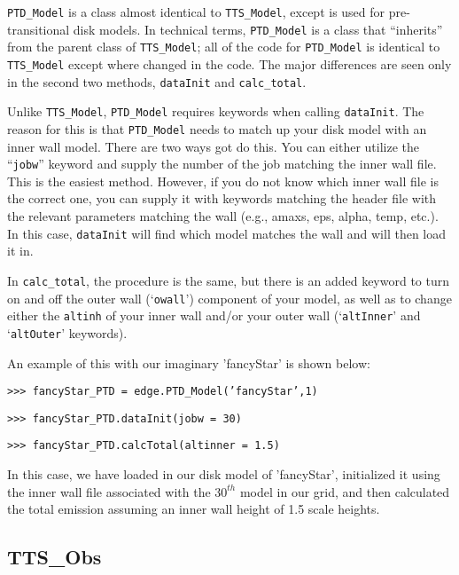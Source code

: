 \documentclass{article}
\begin{document}
\texttt{PTD\_Model} is a class almost identical to \texttt{TTS\_Model}, except is used for pre-transitional disk models. In technical terms, \texttt{PTD\_Model} is a class that “inherits” from the parent class of \texttt{TTS\_Model}; all of the code for \texttt{PTD\_Model} is identical to \texttt{TTS\_Model} except where changed in the code. The major differences are seen only in the second two methods, \texttt{dataInit} and \texttt{calc\_total}.
 
Unlike \texttt{TTS\_Model}, \texttt{PTD\_Model} requires keywords when calling \texttt{dataInit}. The reason for this is that \texttt{PTD\_Model} needs to match up your disk model with an inner wall model. There are two ways got do this. You can either utilize the “\texttt{jobw}” keyword and supply the number of the job matching the inner wall file. This is the easiest method. However, if you do not know which inner wall file is the correct one, you can supply it with keywords matching the header file with the relevant parameters matching the wall (e.g., amaxs, eps, alpha, temp, etc.). In this case, \texttt{dataInit} will find which model matches the wall and will then load it in. 

 
In \texttt{calc\_total}, the procedure is the same, but there is an added keyword to turn on and off the outer wall (‘\texttt{owall}’) component of your model, as well as to change either the \texttt{altinh} of your inner wall and/or your outer wall (‘\texttt{altInner}’ and ‘\texttt{altOuter}’ keywords). 
 
 An example of this with our imaginary 'fancyStar' is shown below:

\vspace{2mm}
\texttt{>>> fancyStar\_PTD = edge.PTD\_Model('fancyStar',1)}

\texttt{>>> fancyStar\_PTD.dataInit(jobw = 30)}

\texttt{>>> fancyStar\_PTD.calcTotal(altinner = 1.5)}
\vspace{2mm}
 
In this case, we have loaded in our disk model of 'fancyStar', initialized it using the inner wall file associated with the $30^{th}$ model in our grid, and then calculated the total emission assuming an inner wall height of 1.5 scale heights. 
 
 
\subsection{TTS\_Obs}
 
\end{document}
